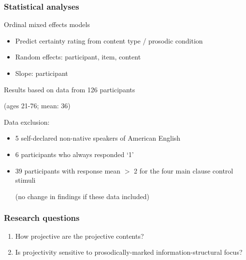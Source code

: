 \documentclass[pdf,xcolor=table,envcountsect,handout]{beamer}
\begin{document}
\begin{frame}
\frametitle{Statistical analyses}

Ordinal mixed effects models 

\begin{itemize}[topsep=-1ex,leftmargin=5ex,itemsep=-1pt]

\item Predict certainty rating from content type / prosodic condition 

\item Random effects: participant, item, content

\item Slope: participant
 
\end{itemize}

\bigskip
\pause

Results based on data from 126 participants \begin{small} (ages 21-76; mean: 36)\end{small}

Data exclusion:

\begin{itemize}[topsep=-1ex,leftmargin=5ex,itemsep=-1pt]

\item 5 self-declared non-native speakers of American English %

\item 6 participants who always responded `1' %

\item 39 participants with response mean $>$ 2 for the four main clause control stimuli \begin{footnotesize}(no change in findings if these data included)\end{footnotesize}

\end{itemize}

\end{frame}

\begin{frame}
\frametitle{Research questions}

\begin{enumerate}

\item How projective are the projective contents?

\medskip

\item Is projectivity sensitive to prosodically-marked information-structural focus?

\end{enumerate}

\end{frame}
\end{document}
